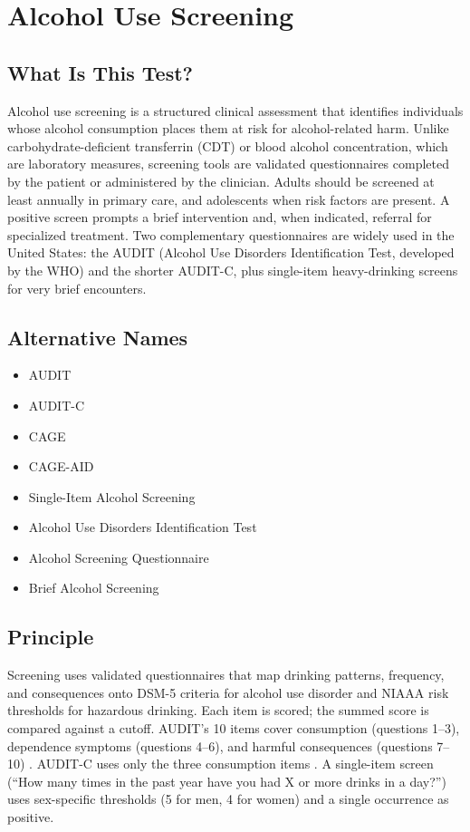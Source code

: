 \chapter{Alcohol Use Screening}

\section*{What Is This Test?}
Alcohol use screening is a structured clinical assessment that identifies individuals whose alcohol consumption places them at risk for alcohol-related harm. Unlike carbohydrate-deficient transferrin (CDT) or blood alcohol concentration, which are laboratory measures, screening tools are validated questionnaires completed by the patient or administered by the clinician. Adults should be screened at least annually in primary care, and adolescents when risk factors are present. A positive screen prompts a brief intervention and, when indicated, referral for specialized treatment. Two complementary questionnaires are widely used in the United States: the AUDIT (Alcohol Use Disorders Identification Test, developed by the WHO) and the shorter AUDIT-C, plus single-item heavy-drinking screens for very brief encounters.

\section*{Alternative Names}
\begin{itemize}
  \item AUDIT
  \item AUDIT-C
  \item CAGE
  \item CAGE-AID
  \item Single-Item Alcohol Screening
  \item Alcohol Use Disorders Identification Test
  \item Alcohol Screening Questionnaire
  \item Brief Alcohol Screening
\end{itemize}
\section*{Principle}
Screening uses validated questionnaires that map drinking patterns, frequency, and consequences onto DSM-5 criteria for alcohol use disorder and NIAAA risk thresholds for hazardous drinking. Each item is scored; the summed score is compared against a cutoff. AUDIT's 10 items cover consumption (questions 1--3), dependence symptoms (questions 4--6), and harmful consequences (questions 7--10) \cite{saunders1993development}. AUDIT-C uses only the three consumption items \cite{bush1998audit}. A single-item screen (``How many times in the past year have you had X or more drinks in a day?'') uses sex-specific thresholds (5 for men, 4 for women) and a single occurrence as positive.

